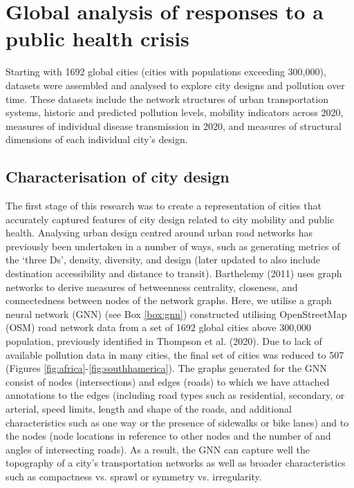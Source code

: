 \documentclass[preprint,10pt]{elsarticle} %
\begin{document}
\section*{\textcolor{OliveGreen}{Global analysis of responses to a public health crisis}}

Starting with 1692 global cities (cities with populations exceeding 300,000\cite{UNDESA2019}), datasets were assembled and analysed to explore city designs and pollution over time. These datasets include the network structures of urban transportation systems, historic and predicted pollution levels, mobility indicators across 2020, measures of individual disease transmission in 2020, and measures of structural dimensions of each individual city's design.

\subsection*{Characterisation of city design}
The first stage of this research was to create a representation of cities that accurately captured features of city design related to city mobility and public health. Analysing urban design centred around urban road networks has previously been undertaken in a number of ways, such as generating metrics of the `three Ds'\cite{Ewing2010}, density, diversity, and design (later updated to also include destination accessibility and distance to transit). Barthelemy (2011)\cite{Barthelemy2011} uses graph networks to derive measures of betweenness centrality, closeness, and connectedness between nodes of the network graphs. Here, we utilise a graph neural network (GNN) (see Box \ref{box:gnn}) constructed utilising OpenStreetMap (OSM) road network data\cite{Boeing2017a} from a set of 1692 global cities above 300,000 population, previously identified in Thompson et al. (2020)\cite{Thompson2020}. Due to lack of available pollution data in many cities, the final set of cities was reduced to 507 (Figures \ref{fig:africa}-\ref{fig:southhamerica}). The graphs generated for the GNN consist of nodes (intersections) and edges (roads) to which we have attached annotations to the edges (including road types such as residential, secondary, or arterial, speed limits, length and shape of the roads, and additional characteristics such as one way or the presence of sidewalks or bike lanes) and to the nodes (node locations in reference to other nodes and the number of and angles of intersecting roads). As a result, the GNN can capture well the topography of a city's transportation networks as well as broader characteristics such as compactness vs. sprawl or symmetry vs. irregularity.  
\end{document}

